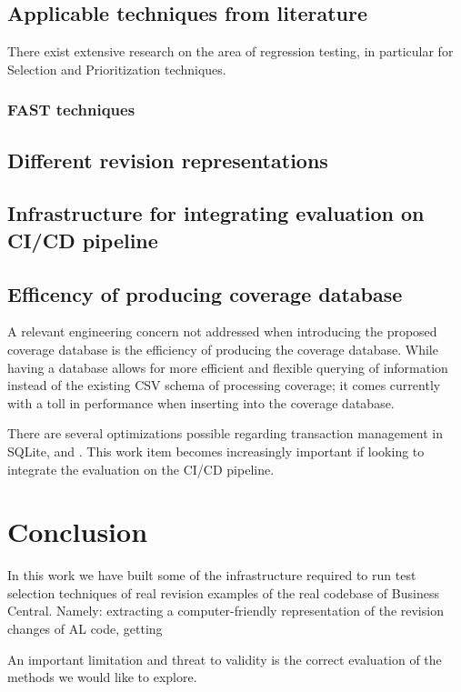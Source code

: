 \documentclass{article}
\begin{document}
\subsection{Applicable techniques from literature}
There exist extensive research on the area of regression testing, in particular for Selection and Prioritization techniques.
\subsubsection{FAST techniques}
\subsection{Different revision representations}

\subsection{Infrastructure for integrating evaluation on CI/CD pipeline}

\subsection{Efficency of producing coverage database}
A relevant engineering concern not addressed when introducing the proposed coverage database is the efficiency of producing the coverage database. While having a database allows for more efficient and flexible querying of information instead of the existing CSV schema of processing coverage; it comes currently with a toll in performance when inserting into the coverage database.

There are several optimizations possible regarding transaction management in SQLite, and . This work item becomes increasingly important if looking to integrate the evaluation on the CI/CD pipeline.

\section{Conclusion}
In this work we have built some of the infrastructure required to run test selection techniques of real revision examples of the real codebase of Business Central. Namely: extracting a computer-friendly representation of the revision changes of AL code, getting

An important limitation and threat to validity is the correct evaluation of the methods we would like to explore.

\printbibliography
\end{document}
